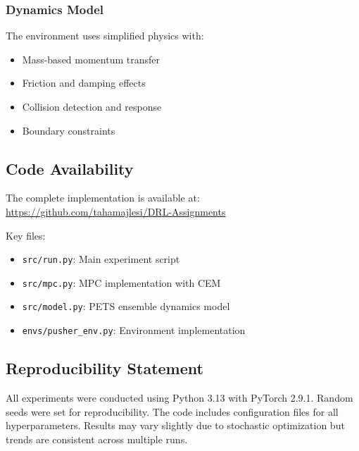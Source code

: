 \documentclass[10pt,twocolumn,letterpaper]{article}
\begin{document}
\subsubsection{Dynamics Model}

The environment uses simplified physics with:
\begin{itemize}
\item Mass-based momentum transfer
\item Friction and damping effects
\item Collision detection and response
\item Boundary constraints
\end{itemize}

\subsection{Code Availability}

The complete implementation is available at: \url{https://github.com/tahamajlesi/DRL-Assignments}

Key files:
\begin{itemize}
\item \texttt{src/run.py}: Main experiment script
\item \texttt{src/mpc.py}: MPC implementation with CEM
\item \texttt{src/model.py}: PETS ensemble dynamics model
\item \texttt{envs/pusher\_env.py}: Environment implementation
\end{itemize}

\subsection{Reproducibility Statement}

All experiments were conducted using Python 3.13 with PyTorch 2.9.1. Random seeds were set for reproducibility. The code includes configuration files for all hyperparameters. Results may vary slightly due to stochastic optimization but trends are consistent across multiple runs.
\end{document}
